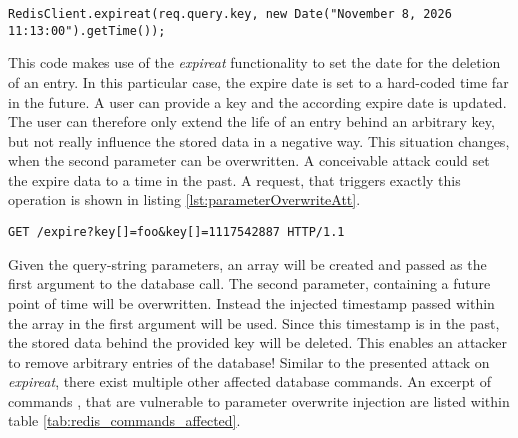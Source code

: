 \begin{lstlisting}[caption={Vulnerable NodeJS example for parameter overwrite injection against Redis}, label={lst:parameterOverwriteApp}]
RedisClient.expireat(req.query.key, new Date("November 8, 2026 11:13:00").getTime());
\end{lstlisting}

This code makes use of the \emph{expireat} functionality to set the date for the deletion of an entry. In this particular case, the expire date is set to a hard-coded time far in the future. A user can provide a key and the according expire date is updated. The user can therefore only extend the life of an entry behind an arbitrary key, but not really influence the stored data in a negative way. This situation changes, when the second parameter can be overwritten. A conceivable attack could set the expire data to a time in the past. A request, that triggers exactly this operation is shown in listing \ref{lst:parameterOverwriteAtt}. \\

\begin{lstlisting}[caption={Attack vector against Redis for query selector injection via the query-string parameter}, label={lst:parameterOverwriteAtt}]
GET /expire?key[]=foo&key[]=1117542887 HTTP/1.1
\end{lstlisting}

Given the query-string parameters, an array will be created and passed as the first argument to the database call. The second parameter, containing a future point of time will be overwritten. Instead the injected timestamp passed within the array in the first argument will be used. Since this timestamp is in the past, the stored data behind the provided key will be deleted. This enables an attacker to remove arbitrary entries of the database! Similar to the presented attack on \emph{expireat}, there exist multiple other affected database commands. An excerpt of commands \cite{Sanfilippo2016}, that are vulnerable to parameter overwrite injection are listed within table \ref{tab:redis_commands_affected}. \\


